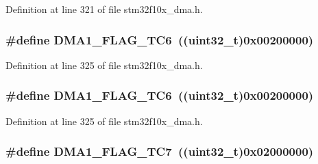 Definition at line 321 of file stm32f10x\+\_\+dma.\+h.

\subsubsection[{\texorpdfstring{D\+M\+A1\+\_\+\+F\+L\+A\+G\+\_\+\+T\+C6}{DMA1_FLAG_TC6}}]{\setlength{\rightskip}{0pt plus 5cm}\#define D\+M\+A1\+\_\+\+F\+L\+A\+G\+\_\+\+T\+C6~(({\bf uint32\+\_\+t})0x00200000)}\hypertarget{group___d_m_a__flags__definition_ga85276600ddf436d4f268199e0df9c54a}{}\label{group___d_m_a__flags__definition_ga85276600ddf436d4f268199e0df9c54a}


Definition at line 325 of file stm32f10x\+\_\+dma.\+h.

\subsubsection[{\texorpdfstring{D\+M\+A1\+\_\+\+F\+L\+A\+G\+\_\+\+T\+C6}{DMA1_FLAG_TC6}}]{\setlength{\rightskip}{0pt plus 5cm}\#define D\+M\+A1\+\_\+\+F\+L\+A\+G\+\_\+\+T\+C6~(({\bf uint32\+\_\+t})0x00200000)}\hypertarget{group___d_m_a__flags__definition_ga85276600ddf436d4f268199e0df9c54a}{}\label{group___d_m_a__flags__definition_ga85276600ddf436d4f268199e0df9c54a}


Definition at line 325 of file stm32f10x\+\_\+dma.\+h.

\subsubsection[{\texorpdfstring{D\+M\+A1\+\_\+\+F\+L\+A\+G\+\_\+\+T\+C7}{DMA1_FLAG_TC7}}]{\setlength{\rightskip}{0pt plus 5cm}\#define D\+M\+A1\+\_\+\+F\+L\+A\+G\+\_\+\+T\+C7~(({\bf uint32\+\_\+t})0x02000000)}\hypertarget{group___d_m_a__flags__definition_ga327907756920f193d5d57d8cca845ad6}{}\label{group___d_m_a__flags__definition_ga327907756920f193d5d57d8cca845ad6}


